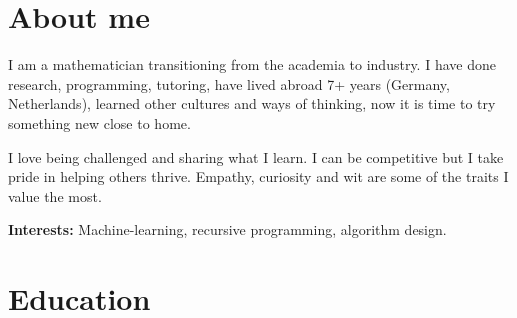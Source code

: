 \documentclass[a4paper,11pt]{twentysecondcv} %
\begin{document}
\section{About me} 
	\begin{onehalfspace}
		I am a mathematician transitioning from the academia to industry.\newline
		I have done research, programming, tutoring, have lived abroad 7+ years (Germany, Netherlands), learned other cultures and ways of thinking, now it is time to try something new close to home.
		
		
		I love being challenged and sharing what I learn.
		I can be competitive but I take pride in helping others thrive. Empathy, curiosity and wit are some of the traits I value the most.
		
		\textbf{Interests:} Machine-learning, recursive programming, algorithm design.
	\end{onehalfspace}

\section{Education}

\begin{twenty} %
\end{twenty}
\end{document}
